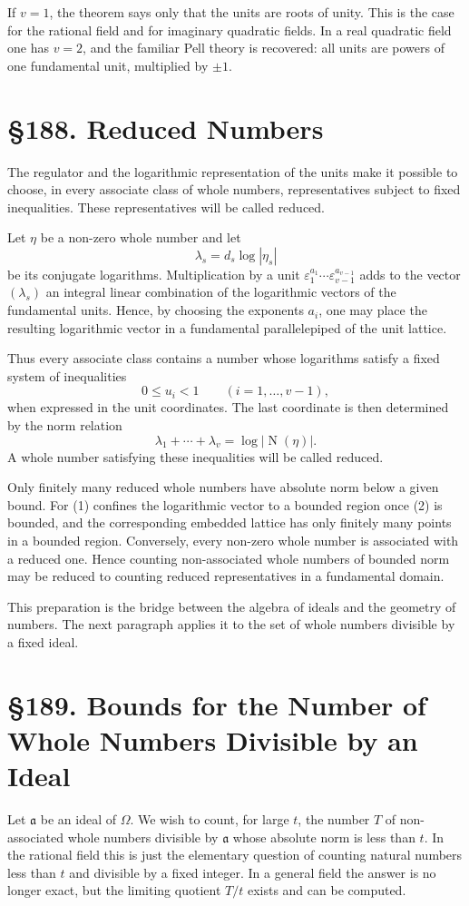 \documentclass[11pt,a4paper]{book}
\newcommand{\webersection}[2]{\clearpage\section*{\S #1. #2}}
\providecommand{\ideala}{\mathfrak a}
\providecommand{\N}{\operatorname{N}}
\begin{document}
If \(v=1\), the theorem says only that the units are roots of unity.  This is the case for the rational field and for imaginary quadratic fields.  In a real quadratic field one has \(v=2\), and the familiar Pell theory is recovered: all units are powers of one fundamental unit, multiplied by \(\pm1\).

\webersection{188}{Reduced Numbers}

The regulator and the logarithmic representation of the units make it possible to choose, in every associate class of whole numbers, representatives subject to fixed inequalities.  These representatives will be called reduced.

Let \(\eta\) be a non-zero whole number and let
\[
  \lambda_s=d_s\log|\eta_s|
\]
be its conjugate logarithms.  Multiplication by a unit \(\varepsilon_1^{a_1}\cdots\varepsilon_{v-1}^{a_{v-1}}\)
adds to the vector \((\lambda_s)\) an integral linear combination of the logarithmic vectors of the fundamental units.  Hence, by choosing the exponents \(a_i\), one may place the resulting logarithmic vector in a fundamental parallelepiped of the unit lattice.

Thus every associate class contains a number whose logarithms satisfy a fixed system of inequalities
\[
  0\le u_i<1\qquad (i=1,
\ldots,v-1),
\tag{1}
\]
when expressed in the unit coordinates.  The last coordinate is then determined by the norm relation
\[
  \lambda_1+\cdots+\lambda_v=
\log|
\N(\eta)|.
\tag{2}
\]
A whole number satisfying these inequalities will be called reduced.

Only finitely many reduced whole numbers have absolute norm below a given bound.  For (1) confines the logarithmic vector to a bounded region once (2) is bounded, and the corresponding embedded lattice has only finitely many points in a bounded region.  Conversely, every non-zero whole number is associated with a reduced one.  Hence counting non-associated whole numbers of bounded norm may be reduced to counting reduced representatives in a fundamental domain.

This preparation is the bridge between the algebra of ideals and the geometry of numbers.  The next paragraph applies it to the set of whole numbers divisible by a fixed ideal.

\webersection{189}{Bounds for the Number of Whole Numbers Divisible by an Ideal}

Let \(\ideala\) be an ideal of \(\Omega\).  We wish to count, for large \(t\), the number \(T\) of non-associated whole numbers divisible by \(\ideala\) whose absolute norm is less than \(t\).  In the rational field this is just the elementary question of counting natural numbers less than \(t\) and divisible by a fixed integer.  In a general field the answer is no longer exact, but the limiting quotient \(T/t\) exists and can be computed.
\end{document}
